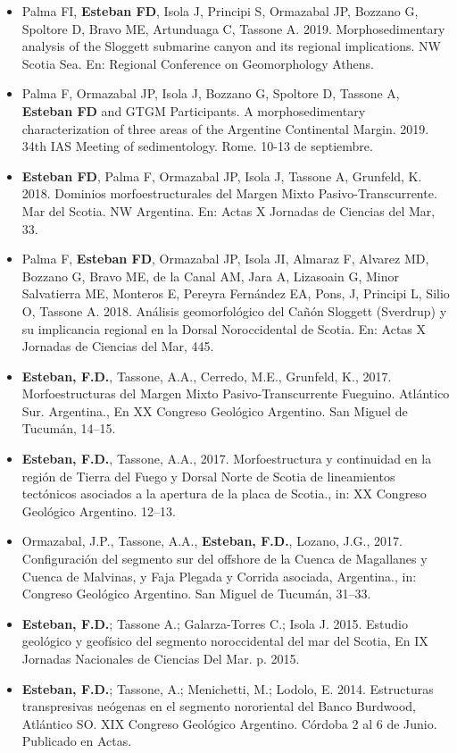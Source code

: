 \documentclass[11pt, a4paper]{article}
\begin{document}
\begin{itemize}
    \item Palma FI, \textbf{Esteban FD}, Isola J, Principi S, Ormazabal JP, Bozzano G, Spoltore D, Bravo ME, Artunduaga C, Tassone A. 2019. Morphosedimentary analysis of the Sloggett submarine canyon and its regional implications. NW Scotia Sea. En: Regional Conference on Geomorphology Athens.
    \item Palma F, Ormazabal JP, Isola J, Bozzano G, Spoltore D, Tassone A, \textbf{Esteban FD} and GTGM Participants. A morphosedimentary characterization of three areas of the Argentine Continental Margin. 2019. 34th IAS Meeting of sedimentology. Rome. 10-13 de septiembre.
    \item \textbf{Esteban FD}, Palma F, Ormazabal JP, Isola J, Tassone A, Grunfeld, K. 2018. Dominios morfoestructurales del Margen Mixto Pasivo-Transcurrente. Mar del Scotia. NW Argentina. En: Actas X Jornadas de Ciencias del Mar, 33.
    \item Palma F, \textbf{Esteban FD}, Ormazabal JP, Isola JI, Almaraz F, Alvarez MD, Bozzano G, Bravo ME, de la Canal AM, Jara A, Lizasoain G, Minor Salvatierra ME, Monteros E, Pereyra Fernández EA, Pons, J, Principi L, Silio O, Tassone A. 2018. Análisis geomorfológico del Cañón Sloggett (Sverdrup) y su implicancia regional en la Dorsal Noroccidental de Scotia. En: Actas X Jornadas de Ciencias del Mar, 445.
    \item \textbf{Esteban, F.D.}, Tassone, A.A., Cerredo, M.E., Grunfeld, K., 2017. Morfoestructuras del Margen Mixto Pasivo-Transcurrente Fueguino. Atlántico Sur. Argentina., En XX Congreso Geológico Argentino. San Miguel de Tucumán, 14–15.
    \item \textbf{Esteban, F.D.}, Tassone, A.A., 2017. Morfoestructura y continuidad en la región de Tierra del Fuego y Dorsal Norte de Scotia de lineamientos tectónicos asociados a la apertura de la placa de Scotia., in: XX Congreso Geológico Argentino. 12–13.
    \item Ormazabal, J.P., Tassone, A.A., \textbf{Esteban, F.D.}, Lozano, J.G., 2017. Configuración del segmento sur del offshore de la Cuenca de Magallanes y Cuenca de Malvinas, y Faja Plegada y Corrida asociada, Argentina., in: Congreso Geológico Argentino. San Miguel de Tucumán, 31–33.
    \item \textbf{Esteban, F.D.}; Tassone A.; Galarza-Torres C.; Isola J. 2015. Estudio geológico y geofísico del segmento noroccidental del mar del Scotia, En IX Jornadas Nacionales de Ciencias Del Mar. p. 2015.
    \item \textbf{Esteban, F.D.}; Tassone, A.; Menichetti, M.; Lodolo, E. 2014. Estructuras transpresivas neógenas en el segmento nororiental del Banco Burdwood, Atlántico SO. XIX Congreso Geológico Argentino. Córdoba 2 al 6 de Junio. Publicado en Actas.

\end{itemize}
\end{document}
